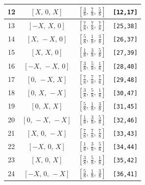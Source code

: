 \documentclass[fleqn,8pt]{jsarticle}
\begin{document}
\begin{longtable}{cccc}
12 & $\left[ X,\, 0,\, X \right]$ & $\left[ \frac{3}{8},\, \frac{7}{8},\, \frac{5}{8} \right]$ & {\tt [12,17]} \\ \hline
13 & $\left[ - X,\, X,\, 0 \right]$ & $\left[ \frac{7}{8},\, \frac{7}{8},\, \frac{7}{8} \right]$ & {\tt [25,38]} \\ \hline
14 & $\left[ X,\, - X,\, 0 \right]$ & $\left[ \frac{5}{8},\, \frac{1}{8},\, \frac{3}{8} \right]$ & {\tt [26,37]} \\ \hline
15 & $\left[ X,\, X,\, 0 \right]$ & $\left[ \frac{1}{8},\, \frac{3}{8},\, \frac{5}{8} \right]$ & {\tt [27,39]} \\ \hline
16 & $\left[ - X,\, - X,\, 0 \right]$ & $\left[ \frac{3}{8},\, \frac{5}{8},\, \frac{1}{8} \right]$ & {\tt [28,40]} \\ \hline
17 & $\left[ 0,\, - X,\, X \right]$ & $\left[ \frac{7}{8},\, \frac{7}{8},\, \frac{7}{8} \right]$ & {\tt [29,48]} \\ \hline
18 & $\left[ 0,\, X,\, - X \right]$ & $\left[ \frac{3}{8},\, \frac{5}{8},\, \frac{1}{8} \right]$ & {\tt [30,47]} \\ \hline
19 & $\left[ 0,\, X,\, X \right]$ & $\left[ \frac{5}{8},\, \frac{1}{8},\, \frac{3}{8} \right]$ & {\tt [31,45]} \\ \hline
20 & $\left[ 0,\, - X,\, - X \right]$ & $\left[ \frac{1}{8},\, \frac{3}{8},\, \frac{5}{8} \right]$ & {\tt [32,46]} \\ \hline
21 & $\left[ X,\, 0,\, - X \right]$ & $\left[ \frac{7}{8},\, \frac{7}{8},\, \frac{7}{8} \right]$ & {\tt [33,43]} \\ \hline
22 & $\left[ - X,\, 0,\, X \right]$ & $\left[ \frac{1}{8},\, \frac{3}{8},\, \frac{5}{8} \right]$ & {\tt [34,44]} \\ \hline
23 & $\left[ X,\, 0,\, X \right]$ & $\left[ \frac{3}{8},\, \frac{5}{8},\, \frac{1}{8} \right]$ & {\tt [35,42]} \\ \hline
24 & $\left[ - X,\, 0,\, - X \right]$ & $\left[ \frac{5}{8},\, \frac{1}{8},\, \frac{3}{8} \right]$ & {\tt [36,41]} \\
\end{longtable}
\renewcommand{\arraystretch}{1.2}
\end{document}
